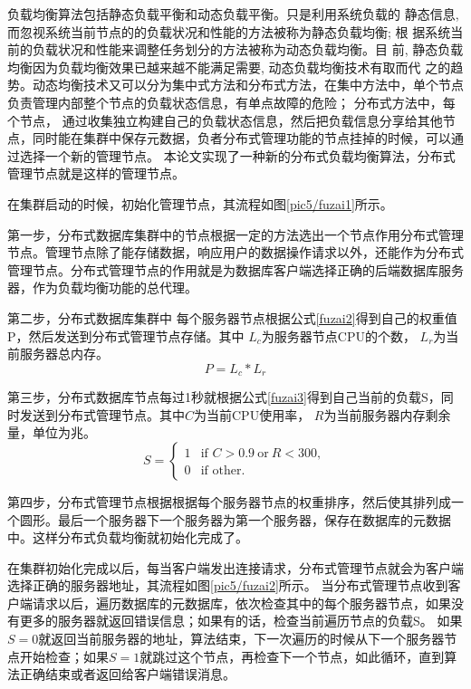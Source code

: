 负载均衡算法包括静态负载平衡和动态负载平衡。只是利用系统负载的
静态信息, 而忽视系统当前节点的的负载状况和性能的方法被称为静态负载均衡; 根
据系统当前的负载状况和性能来调整任务划分的方法被称为动态负载均衡。目
前, 静态负载均衡因为负载均衡效果已越来越不能满足需要, 动态负载均衡技术有取而代
之的趋势。动态均衡技术又可以分为集中式方法和分布式方法，在集中方法中，单个节点
负责管理内部整个节点的负载状态信息，有单点故障的危险；
分布式方法中，每个节点，
通过收集独立构建自己的负载状态信息，然后把负载信息分享给其他节点，同时能在集群中保存元数据，负者分布式管理功能的节点挂掉的时候，可以通过选择一个新的管理节点。
本论文实现了一种新的分布式负载均衡算法，分布式管理节点就是这样的管理节点。

在集群启动的时候，初始化管理节点，其流程如图\ref{pic5/fuzai1}所示。

第一步，分布式数据库集群中的节点根据一定的方法选出一个节点作用分布式管理节点。管理节点除了能存储数据，响应用户的数据操作请求以外，还能作为分布式管理节点。分布式管理节点的作用就是为数据库客户端选择正确的后端数据库服务器，作为负载均衡功能的总代理。

第二步，分布式数据库集群中
每个服务器节点根据公式\ref{fuzai2}得到自己的权重值P，然后发送到分布式管理节点存储。其中
$ L_c $为服务器节点CPU的个数， $ L_r $为当前服务器总内存。
\begin{equation}
P=L_c * L_r \label{fuzai2}
\end{equation}

第三步，分布式数据库节点每过1秒就根据公式\ref{fuzai3}得到自己当前的负载S，同时发送到分布式管理节点。其中$ C $为当前CPU使用率， $ R $为当前服务器内存剩余量，单位为兆。
\begin{equation}
S =
\begin{cases}
1 & \text{if } C >0.9 \: \text{or} \: R<300,\\
0 & \text{if } \text{other}.
\end{cases}   \label{fuzai3}
\end{equation}

第四步，分布式管理节点根据根据每个服务器节点的权重排序，然后使其排列成一个圆形。最后一个服务器下一个服务器为第一个服务器，保存在数据库的元数据中。这样分布式负载均衡就初始化完成了。

在集群初始化完成以后，每当客户端发出连接请求，分布式管理节点就会为客户端选择正确的服务器地址，其流程如图\ref{pic5/fuzai2}所示。
当分布式管理节点收到客户端请求以后，遍历数据库的元数据库，依次检查其中的每个服务器节点，如果没有更多的服务器就返回错误信息；如果有的话，检查当前遍历节点的负载S。
如果$ S=0 $就返回当前服务器的地址，算法结束，下一次遍历的时候从下一个服务器节点开始检查；如果$ S=1 $就跳过这个节点，再检查下一个节点，如此循环，直到算法正确结束或者返回给客户端错误消息。
